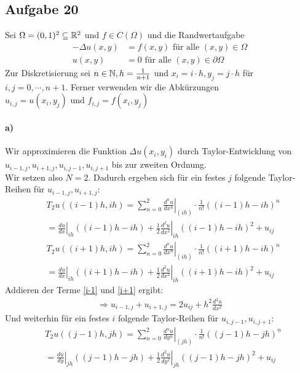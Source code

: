 \subsection*{Aufgabe 20}
Sei $\Omega=(0,1)^2 \subseteq \mathbb R^2$ und $f \in C(\Omega)$ und die Randwertaufgabe
\begin{align*}
-\Delta u(x,y)&=f(x,y) \text{ für alle }(x,y) \in \Omega\\
u(x,y)&=0 \text{ für alle } (x,y) \in \partial\Omega
\end{align*}
Zur Diskretisierung sei $n\in \mathbb N, h=\frac{1}{n+1}$ und $x_i=i \cdot h, y_j=j\cdot h$ für $i,j=0, \cdots, n+1$.
Ferner verwenden wir die Abkürzungen $u_{i,j} = u(x_i, y_j) \text{ und } f_{i,j}= f(x_i, y_j)$
\paragraph*{a)}
Wir approximieren die Funktion $\Delta u(x_i,y_i)$ durch Taylor-Entwicklung von $u_{i-1,j}, u_{i+1,j}, u_{i,j-1}, u_{i,j+1}$ bis zur zweiten Ordnung.\\
\newline
Wir setzen also $N=2$. Dadurch ergeben sich für ein festes $j$ folgende Taylor-Reihen für $u_{i-1,j}, u_{i+1,j}$:
\begin{align}
&T_2 u((i-1)h, ih)=\sum_{n=0}^2 \left. \frac{d^n u}{dx^n} \right|_{(ih)} \cdot \frac{1}{n!}((i-1)h-ih)^n\\ &=\left.\frac{du}{dx}\right |_{ih} ((i-1)h-ih)+\left.\frac{1}{2}\frac{d^2u}{dx^2}\right|_{ih}((i-1)h-ih)^2+u_{ij}\label{i-1}\end{align}
\begin{align}
&T_2 u((i+1)h, ih)=\sum_{n=0}^2 \left. \frac{d^n u}{dx^n} \right|_{(ih)} \cdot \frac{1}{n!}((i+1)h-ih)^n\\ &=\left.\frac{du}{dx}\right |_{ih} ((i+1)h-ih)+\left.\frac{1}{2}\frac{d^2u}{dx^2}\right|_{ih}((i+1)h-ih)^2+u_{ij}\label{i+1}
\end{align}
Addieren der Terme \eqref{i-1} und \eqref{i+1} ergibt:
\begin{align*}
\Rightarrow u_{i-1,j}+u_{i+1,j}=2u_{ij} + h^2 \frac{d^2u}{dx^2}
\end{align*}
Und weiterhin für ein festes $i$ folgende Taylor-Reihen für $u_{i,j-1}, u_{i,j+1}$:
\begin{align}
&T_2 u((j-1)h, jh)=\sum_{n=0}^2 \left. \frac{d^n u}{dy^n} \right|_{(jh)} \cdot \frac{1}{n!}((j-1)h-jh)^n\\ &=\left.\frac{du}{dy}\right |_{jh} ((j-1)h-jh)+\left.\frac{1}{2}\frac{d^2u}{dy^2}\right|_{jh}((j-1)h-jh)^2+u_{ij}\label{j-1}\end{align}

